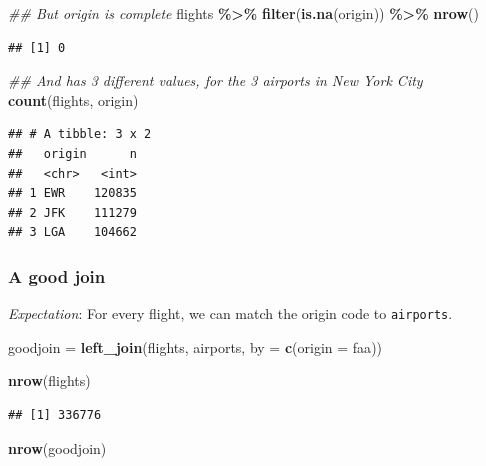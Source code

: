 \documentclass[
]{article}
\newenvironment{Shaded}{\begin{snugshade}}{\end{snugshade}}
\newcommand{\CommentTok}[1]{\textcolor[rgb]{0.56,0.35,0.01}{\textit{#1}}}
\newcommand{\DataTypeTok}[1]{\textcolor[rgb]{0.13,0.29,0.53}{#1}}
\newcommand{\KeywordTok}[1]{\textcolor[rgb]{0.13,0.29,0.53}{\textbf{#1}}}
\newcommand{\NormalTok}[1]{#1}
\newcommand{\OperatorTok}[1]{\textcolor[rgb]{0.81,0.36,0.00}{\textbf{#1}}}
\newcommand{\StringTok}[1]{\textcolor[rgb]{0.31,0.60,0.02}{#1}}
\begin{document}
\begin{Shaded}
\begin{Highlighting}[]
\CommentTok{\#\# But origin is complete}
\NormalTok{flights }\OperatorTok{\%\textgreater{}\%}\StringTok{ }
\StringTok{    }\KeywordTok{filter}\NormalTok{(}\KeywordTok{is.na}\NormalTok{(origin)) }\OperatorTok{\%\textgreater{}\%}\StringTok{ }
\StringTok{    }\KeywordTok{nrow}\NormalTok{()}
\end{Highlighting}
\end{Shaded}

\begin{verbatim}
## [1] 0
\end{verbatim}

\begin{Shaded}
\begin{Highlighting}[]
\CommentTok{\#\# And has 3 different values, for the 3 airports in New York City}
\KeywordTok{count}\NormalTok{(flights, origin)}
\end{Highlighting}
\end{Shaded}

\begin{verbatim}
## # A tibble: 3 x 2
##   origin      n
##   <chr>   <int>
## 1 EWR    120835
## 2 JFK    111279
## 3 LGA    104662
\end{verbatim}

\hypertarget{a-good-join}{%
\subsubsection{A good join}\label{a-good-join}}

\emph{Expectation}: For every flight, we can match the origin code to \texttt{airports}.

\begin{Shaded}
\begin{Highlighting}[]
\NormalTok{goodjoin =}\StringTok{ }\KeywordTok{left\_join}\NormalTok{(flights, airports, }\DataTypeTok{by =} \KeywordTok{c}\NormalTok{(}\StringTok{\textquotesingle{}origin\textquotesingle{}}\NormalTok{ =}\StringTok{ \textquotesingle{}faa\textquotesingle{}}\NormalTok{))}

\KeywordTok{nrow}\NormalTok{(flights)}
\end{Highlighting}
\end{Shaded}

\begin{verbatim}
## [1] 336776
\end{verbatim}

\begin{Shaded}
\begin{Highlighting}[]
\KeywordTok{nrow}\NormalTok{(goodjoin)}
\end{Highlighting}
\end{Shaded}
\end{document}
